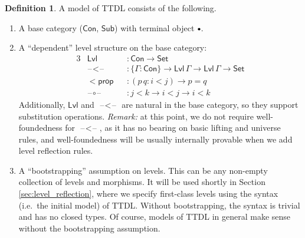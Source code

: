 \documentclass[a4paper,UKenglish,cleveref, autoref, thm-restate]{lipics-v2021}
\theoremstyle{remark}
\theoremstyle{definition}
\newtheorem{mydefinition}{Definition}
\newcommand{\Seti}{\mathsf{Set}}
\newcommand{\Con}{\mathsf{Con}}
\newcommand{\Sub}{\mathsf{Sub}}
\newcommand{\emptycon}{\scaleobj{.75}\bullet}
\newcommand{\blank}{\mathord{\hspace{1pt}\text{--}\hspace{1pt}}}
\newcommand{\Lvl}{\mathsf{Lvl}}
\newcommand{\msf}[1]{\mathsf{#1}}
\begin{document}
\begin{mydefinition} A model of TTDL consists of the following.
\begin{enumerate}
\item
  A base category ($\Con$, $\Sub$) with terminal object $\emptycon$.
\item
  A ``dependent'' level structure on the base category:
  \begin{alignat*}{3}
    &\Lvl                  &&: \Con \to \Seti\\
    &\blank\!<\!\blank     &&: \{\Gamma : \Con\} \to \Lvl\,\Gamma \to \Lvl\,\Gamma \to \Seti\\
    &<\!\msf{prop}         &&: (p\,q : i < j) \to p = q\\
    &\blank\!\circ\!\blank &&: j < k \to i < j \to i < k
  \end{alignat*}
  Additionally, $\Lvl$ and $\blank\!<\!\blank$ are natural in the base category,
  so they support substitution operations. \emph{Remark:} at this point, we do not require well-foundedness
  for $\blank\!<\!\blank$, as it has no bearing on basic lifting and universe rules, and
  well-foundedness will be usually internally provable when we add level reflection rules.
\item
  A ``bootstrapping'' assumption on levels. This can be any non-empty collection
  of levels and morphisms. It will be used shortly in Section
  \ref{sec:level_reflection}, where we specify first-class levels using the syntax
  (i.e.\ the initial model) of TTDL. Without bootstrapping, the syntax is
  trivial and has no closed types. Of course, models of TTDL in general make
  sense without the bootstrapping assumption.


\end{enumerate}
\end{mydefinition}
\end{document}
